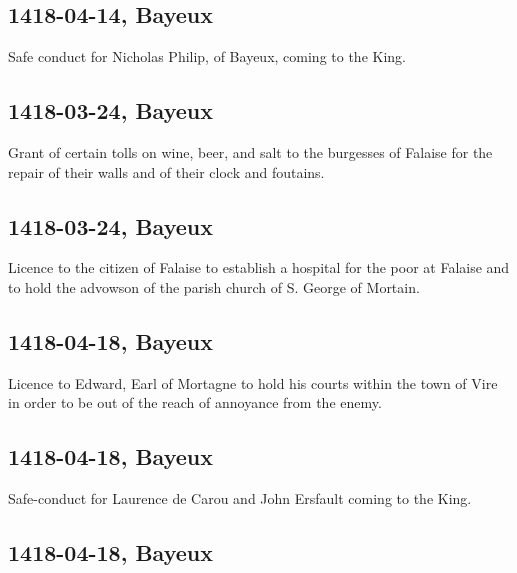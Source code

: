 \documentclass[a4paper,12pt,twoside]{book}
\begin{document}
            \subsection{1418-04-14, Bayeux}
            
                     Safe conduct for Nicholas Philip, of Bayeux, coming to the King.
                  
            \subsection{1418-03-24, Bayeux}
            
                     Grant of certain tolls on wine, beer, and salt to the burgesses of Falaise for the repair of their walls and of their clock and foutains.
                  
            \subsection{1418-03-24, Bayeux}
            
                     Licence to the citizen of Falaise to establish a hospital for the poor at Falaise and to hold the advowson of the parish church of S. George of Mortain.
                  
            \subsection{1418-04-18, Bayeux}
            
                     Licence to Edward, Earl of Mortagne to hold his courts within the town of Vire in order to be out of the reach of annoyance from the enemy.
                  
            \subsection{1418-04-18, Bayeux}
            
                     Safe-conduct for Laurence de Carou and John Ersfault coming to the King.
                  
            \subsection{1418-04-18, Bayeux}
            
\end{document}
